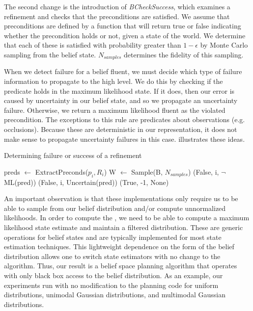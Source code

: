 The second change is the introduction of \emph{BCheckSuccess}, which examines a refinement and
checks that the preconditions
are satisfied. We assume that preconditions are defined by a function
that will return true or false indicating whether the precondition holds or not,
given a state of the world. We determine
that each of these is satisfied with probability greater than
$1-\epsilon$ by Monte Carlo sampling from the belief
state. $N_{samples}$ determines the fidelity of this sampling.

When we detect failure for a belief fluent, we must decide which type
of failure information to propagate to the high level. We do this by
checking if the predicate holds in the maximum likelihood state. If it
does, then our error is caused by uncertainty in our belief state, and so
we propagate an uncertainty failure. Otherwise, we return a maximum
likelihood fluent as the violated precondition. The exceptions to this
rule are predicates about observations (e.g. occlusions). Because
these are deterministic in our representation, it does not make sense
to propagate uncertainty failures in this case. 
illustrates these ideas.


\begin{algorithm}
 \caption{Determining failure or success of a refinement} \label{alg-bcheck}
 \begin{algorithmic}[1]
          \State preds $\leftarrow $ ExtractPreconds($p_i, R_i$)
          \State W $\leftarrow$ Sample(B, $N_{samples}$)
                     \State \Return (False, i, $\lnot$ML(pred))
                 \Else
                     \State \Return (False, i, Uncertain(pred))
                 \EndIf
              \EndIf
          \EndFor
      \EndFor
      \State \Return (True, -1, None)
  \EndProcedure
 \end{algorithmic}
\end{algorithm}
An important observation is that these implementations only require
us to be able to sample from our belief distribution and/or compute
unnormalized likelihoods. In order to compute the \mld{}, we need to be
able to compute a maximum likelihood state estimate and maintain a
filtered distribution. These are generic operations for belief states
and are typically implemented for most state estimation
techniques. This lightweight dependence on the form of the belief
distribution allows one to switch state estimators with no
change to the algorithm. Thus, our result is a belief space planning
algorithm that operates with only black box access to the belief
distribution. As an example, our experiments run with no modification
to the planning code for uniform distributions, unimodal Gaussian
distributions, and multimodal Gaussian distributions.

